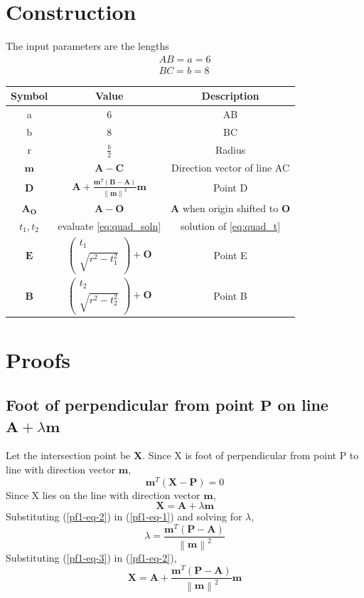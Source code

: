 \documentclass[journal,10pt,twocolumn]{article}
\providecommand{\norm}[1]{\left\lVert#1\right\rVert}
\let\vec\mathbf
\newcommand{\myvec}[1]{\ensuremath{\begin{pmatrix}#1\end{pmatrix}}}
\begin{document}
{\section*{\large Construction}
The input parameters are the lengths
\begin{eqnarray*}
	AB = a = 6\\
	BC = b = 8
\end{eqnarray*}
{
\setlength\extrarowheight{5pt}
\begin{tabular}{|c|c|c|}
	\hline
	\textbf{Symbol}&\textbf{Value}&\textbf{Description}\\
	\hline
	a&6&AB\\
	\hline
	b&8&BC\\
	\hline
	r&$\frac{b}{2}$&Radius\\
	\hline
	$\vec{m}$&$\vec{A-C}$&Direction vector of line AC\\
	\hline
	$\vec{D}$&$\vec{A} + \frac{\vec{m}^T(\vec{B-A})}{\norm{\vec{m}}^2}\vec{m}$&Point D\\[5pt]
	\hline
	$\vec{A_O}$&$\vec{A-O}$&$\vec{A}$ when origin shifted to $\vec{O}$\\
	\hline
	$t_1,t_2$&evaluate \eqref{eq:quad_soln}&solution of \eqref{eq:quad_t}\\[5pt] 
	\hline
	$\vec{E}$&$\myvec{t_1 \\ \sqrt{r^2-t_1^2}}+\vec{O}$&Point E\\[5pt]
	\hline
	$\vec{B}$&$\myvec{t_2 \\ \sqrt{r^2-t_2^2}}+\vec{O}$&Point B\\[5pt]
	\hline
\end{tabular}
}

\section*{\large Proofs}
\subsection*{\normalsize Foot of perpendicular from point $\vec{P}$ on line $\vec{A}+\lambda\vec{m}$}
Let the intersection point be $\vec{X}$. Since X is foot of perpendicular from point P to line with direction vector $\vec{m}$,
\begin{equation}
	\vec{m}^T(\vec{X-P}) = 0
	\label{pf1-eq-1}
\end{equation}
Since X lies on the line with direction vector $\vec{m}$,
\begin{equation}
	\vec{X} = \vec{A}+\lambda\vec{m}
	\label{pf1-eq-2}
\end{equation}
Substituting (\ref{pf1-eq-2}) in (\ref{pf1-eq-1}) and solving for $\lambda$,
\begin{equation}
	\lambda = \frac{\vec{m}^T(\vec{P-A})}{\norm{\vec{m}}^2}
	\label{pf1-eq-3}
\end{equation}
Substituting (\ref{pf1-eq-3}) in (\ref{pf1-eq-2}),
\begin{equation}
\vec{X} = \vec{A} + \frac{\vec{m}^T(\vec{P-A})}{\norm{\vec{m}}^2}\vec{m} 
\end{equation}

}
\end{document}
